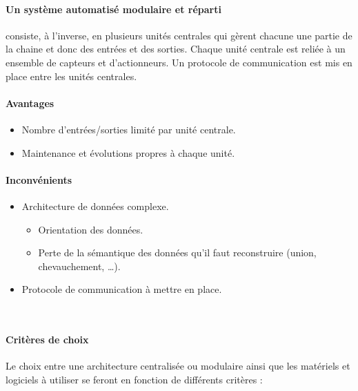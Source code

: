 \paragraph{Un système automatisé modulaire et réparti} consiste, à l'inverse, en plusieurs unités centrales qui gèrent chacune une partie de la chaine et donc des entrées et des sorties. Chaque unité centrale est reliée à un ensemble de capteurs et d'actionneurs. Un protocole de communication est mis en place entre les unités centrales.

\begin{minipage}{0.45\linewidth}
    \paragraph{Avantages}
    \begin{itemize}
        \item Nombre d'entrées/sorties limité par unité centrale.
        \item Maintenance et évolutions propres à chaque unité.
    \end{itemize}
\end{minipage}%
\hfill%
\begin{minipage}{0.5\linewidth}
    \paragraph{Inconvénients}
    \begin{itemize}
        \item Architecture de données complexe.
              \begin{itemize}
                  \item Orientation des données.
                  \item Perte de la sémantique des données qu'il faut reconstruire (union, chevauchement, \dots).
              \end{itemize}
        \item Protocole de communication à mettre en place.
    \end{itemize}
\end{minipage}

\begin{UPSTIactivite}
    \vspace{4cm}
\end{UPSTIactivite}
\lstMakeShortInline~


\paragraph{Critères de choix}
Le choix entre une architecture centralisée ou modulaire ainsi que les matériels et logiciels à utiliser se feront en fonction de différents critères :

